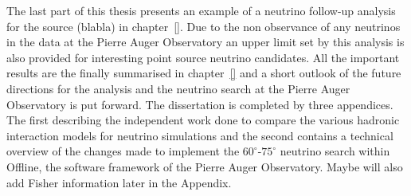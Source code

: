 The last part of this thesis presents an example of a neutrino follow-up analysis for the source (blabla) in chapter~\ref{}. Due to the non observance of any neutrinos in the data at the Pierre Auger Observatory an upper limit set by this analysis is also provided for interesting point source neutrino candidates. All the important results are the finally summarised in chapter~\ref{} and a short outlook of the future directions for the analysis and the neutrino search at the Pierre Auger Observatory is put forward. The dissertation is completed by three appendices. The first describing the independent work done to compare the various hadronic interaction models for neutrino simulations and the second contains a technical overview of the changes made to implement the $60^\circ$-$75^\circ$ neutrino search within Offline, the software framework of the Pierre Auger Observatory. Maybe will also add Fisher information later in the Appendix.


